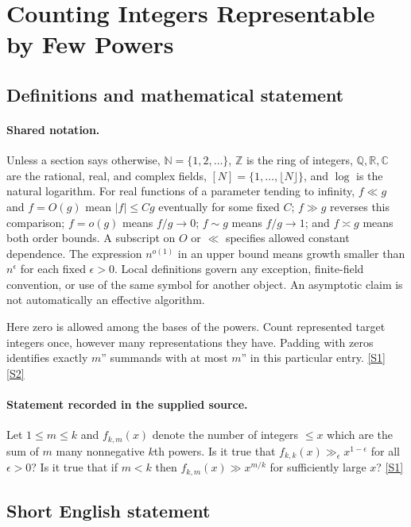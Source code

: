 \documentclass[11pt,a4paper]{article}
\newcommand{\N}{\mathbb{N}}
\newcommand{\Z}{\mathbb{Z}}
\newcommand{\Q}{\mathbb{Q}}
\newcommand{\R}{\mathbb{R}}
\newcommand{\C}{\mathbb{C}}
\newcommand{\sref}[2]{\hyperlink{source:#1:#2}{[S#2]}}
\begin{document}
\section{Counting Integers Representable by Few Powers}\label{statement}


\subsection{Definitions and mathematical statement}

\paragraph{Shared notation.}Unless a section says otherwise, $\N=\{1,2,\ldots\}$,
$\Z$ is the ring of integers, $\Q,\R,\C$ are the rational, real, and complex
fields, $[N]=\{1,\ldots,\lfloor N\rfloor\}$, and $\log$ is the natural
logarithm. For real functions of a parameter tending to infinity,
$f\ll g$ and $f=O(g)$ mean $|f|\leq Cg$ eventually for some fixed $C$;
$f\gg g$ reverses this comparison; $f=o(g)$ means $f/g\to0$;
$f\sim g$ means $f/g\to1$; and $f\asymp g$ means both order bounds.
A subscript on $O$ or $\ll$ specifies allowed constant dependence.
The expression $n^{o(1)}$ in an upper bound means growth smaller than
$n^\epsilon$ for each fixed $\epsilon>0$. Local definitions govern any
exception, finite-field convention, or use of the same symbol for another
object. An asymptotic claim is not automatically an effective algorithm.



Here zero is allowed among the bases of the powers. Count represented target integers once, however many representations they have. Padding with zeros identifies exactly $m$'' summands with at most $m$'' in this particular entry. \sref{statement}{1} \sref{statement}{2}

\paragraph{Statement recorded in the supplied source.}
Let $1\leq m\leq k$ and $f_{k,m}(x)$ denote the number of integers $\leq x$ which are the sum of $m$ many nonnegative $k$th powers. Is it true that $ f_{k,k}(x) \gg_\epsilon x^{1-\epsilon} $ for all $\epsilon>0$? Is it true that if $m<k$ then $ f_{k,m}(x) \gg x^{m/k} $ for sufficiently large $x$? \sref{statement}{1}

\subsection{Short English statement}
\end{document}
